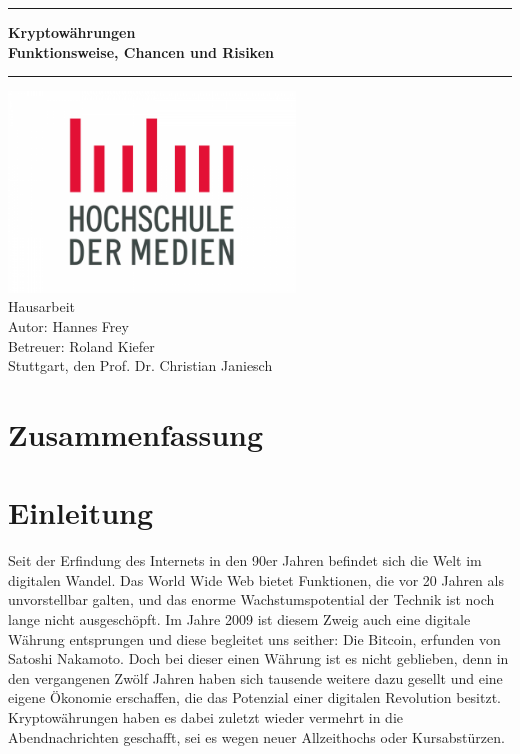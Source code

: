 \documentclass[12pt,oneside]{article}
\newcommand{\JMUTitle}[9]{

  \thispagestyle{empty}
  \vspace*{\stretch{1}}
  {\parindent0cm
  \rule{\linewidth}{.7ex}}
  \begin{flushright}
    \vspace*{\stretch{1}}
    \sffamily\bfseries\Huge
    #1\\
    \vspace*{\stretch{1}}
    \sffamily\bfseries\large
    #2
    \vspace*{\stretch{1}}
  \end{flushright}
  \rule{\linewidth}{.7ex}

  \vspace*{\stretch{1}}
  \begin{center}
    \includegraphics[width=3in]{logo} \\
    \vspace*{\stretch{1}}
    \Large Hausarbeit  \\

    \vspace*{\stretch{2}}
   \large Autor: Hannes Frey \\
    \vspace*{\stretch{1}}
    \large Betreuer:  Roland Kiefer \\[1mm]
    
    \vspace*{\stretch{1}}
    \large Stuttgart, den #6
  \end{center}
}
\begin{document}
  \JMUTitle
      {Kryptowährungen }        %
      {Funktionsweise, Chancen und Risiken}                        %
      
      {Wirtschaftswissenschaftlichen Fakultät}  %
      {W"urzburg 2018}                          %
      {31.05.2021}                              %
      {Prof. Dr. Christian Janiesch}               %
      {Zweitgutachter}                          %
      {Pr"ufungsdatum}                          %

  \clearpage

\lhead{}
    \setcounter{page}{1}

\tableofcontents
\clearpage

\listoffigures

\listoftables
\clearpage

\section*{Zusammenfassung}
\blindtext
\clearpage




\cleardoublepage
{}  
    \setcounter{page}{1}
\lhead{\nouppercase{\leftmark}}


\section{Einleitung} \label{einleitung}

Seit der Erfindung des Internets in den 90er Jahren befindet sich die Welt im digitalen Wandel. Das World Wide Web bietet Funktionen, die vor 20 Jahren als unvorstellbar galten, und das enorme Wachstumspotential der Technik ist noch lange nicht ausgeschöpft. Im Jahre 2009 ist diesem Zweig auch eine digitale Währung entsprungen und diese begleitet uns seither: Die Bitcoin, erfunden von Satoshi Nakamoto. 
Doch bei dieser einen Währung ist es nicht geblieben, denn in den vergangenen Zwölf Jahren haben sich tausende weitere dazu gesellt und eine eigene Ökonomie erschaffen, die das Potenzial einer digitalen Revolution besitzt.
Kryptowährungen haben es dabei zuletzt wieder vermehrt in die Abendnachrichten geschafft, sei es wegen neuer Allzeithochs oder Kursabstürzen.\cite{schredder2018}
\end{document}
